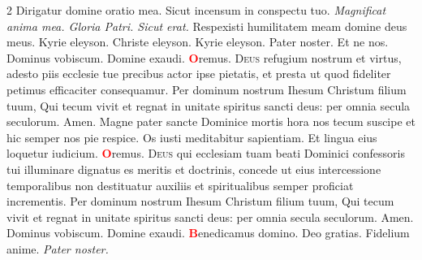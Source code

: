 \begin{multicols}{2}
{}
\newline \V Dirigatur domine oratio mea. \R Sicut incensum in conspectu tuo.
\newline \textit{Magnificat anima mea. Gloria Patri. Sicut erat.}
 Respexisti humilitatem meam domine deus meus.
\newline {} Kyrie eleyson. Christe eleyson. Kyrie eleyson. Pater noster. Et ne nos.
 Dominus vobiscum.  Domine exaudi.
\newline \textcolor{Red}{\bfseries O}remus. 
\lettrine[lines=2]{\zallmancaps \color{Red} D}{eus} refugium nostrum et virtus, adesto piis ecclesie tue precibus actor ipse pietatis, et presta ut quod fideliter petimus efficaciter consequamur. Per dominum nostrum Ihesum Christum filium tuum, Qui tecum vivit et regnat in unitate spiritus sancti deus: per omnia secula seculorum. \R Amen.
\newline {}
\newline {} Magne pater sancte Dominice mortis hora nos tecum suscipe et hic semper nos pie respice.
\newline \V Os iusti meditabitur sapientiam. \R Et lingua eius loquetur iudicium.
\newline \textcolor{Red}{\bfseries O}remus. 
\lettrine[lines=2]{\zallmancaps \color{Blue} D}{eus} qui ecclesiam tuam beati Dominici confessoris tui illuminare dignatus es meritis et doctrinis, concede ut eius intercessione temporalibus non destituatur auxiliis et spiritualibus semper proficiat incrementis. Per dominum nostrum Ihesum Christum filium tuum, Qui tecum vivit et regnat in unitate spiritus sancti deus: per omnia secula seculorum. \R Amen.
 Dominus vobiscum.  Domine exaudi.
\newline \textcolor{Red}{\bfseries B}enedicamus domino. \R Deo gratias.
\newline {}
\newline Fidelium anime.  \textit{Pater noster.}

\vspace{+1em}
\newline {}



\end{multicols}%







